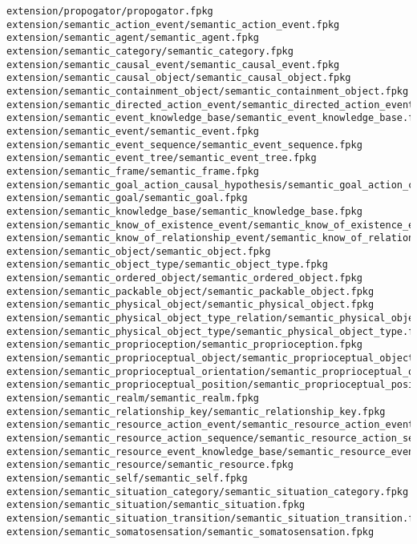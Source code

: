 \begin{lstlisting}
extension/propogator/propogator.fpkg
extension/semantic_action_event/semantic_action_event.fpkg
extension/semantic_agent/semantic_agent.fpkg
extension/semantic_category/semantic_category.fpkg
extension/semantic_causal_event/semantic_causal_event.fpkg
extension/semantic_causal_object/semantic_causal_object.fpkg
extension/semantic_containment_object/semantic_containment_object.fpkg
extension/semantic_directed_action_event/semantic_directed_action_event.fpkg
extension/semantic_event_knowledge_base/semantic_event_knowledge_base.fpkg
extension/semantic_event/semantic_event.fpkg
extension/semantic_event_sequence/semantic_event_sequence.fpkg
extension/semantic_event_tree/semantic_event_tree.fpkg
extension/semantic_frame/semantic_frame.fpkg
extension/semantic_goal_action_causal_hypothesis/semantic_goal_action_causal_hypothesis.fpkg
extension/semantic_goal/semantic_goal.fpkg
extension/semantic_knowledge_base/semantic_knowledge_base.fpkg
extension/semantic_know_of_existence_event/semantic_know_of_existence_event.fpkg
extension/semantic_know_of_relationship_event/semantic_know_of_relationship_event.fpkg
extension/semantic_object/semantic_object.fpkg
extension/semantic_object_type/semantic_object_type.fpkg
extension/semantic_ordered_object/semantic_ordered_object.fpkg
extension/semantic_packable_object/semantic_packable_object.fpkg
extension/semantic_physical_object/semantic_physical_object.fpkg
extension/semantic_physical_object_type_relation/semantic_physical_object_type_relation.fpkg
extension/semantic_physical_object_type/semantic_physical_object_type.fpkg
extension/semantic_proprioception/semantic_proprioception.fpkg
extension/semantic_proprioceptual_object/semantic_proprioceptual_object.fpkg
extension/semantic_proprioceptual_orientation/semantic_proprioceptual_orientation.fpkg
extension/semantic_proprioceptual_position/semantic_proprioceptual_position.fpkg
extension/semantic_realm/semantic_realm.fpkg
extension/semantic_relationship_key/semantic_relationship_key.fpkg
extension/semantic_resource_action_event/semantic_resource_action_event.fpkg
extension/semantic_resource_action_sequence/semantic_resource_action_sequence.fpkg
extension/semantic_resource_event_knowledge_base/semantic_resource_event_knowledge_base.fpkg
extension/semantic_resource/semantic_resource.fpkg
extension/semantic_self/semantic_self.fpkg
extension/semantic_situation_category/semantic_situation_category.fpkg
extension/semantic_situation/semantic_situation.fpkg
extension/semantic_situation_transition/semantic_situation_transition.fpkg
extension/semantic_somatosensation/semantic_somatosensation.fpkg

\end{lstlisting}
